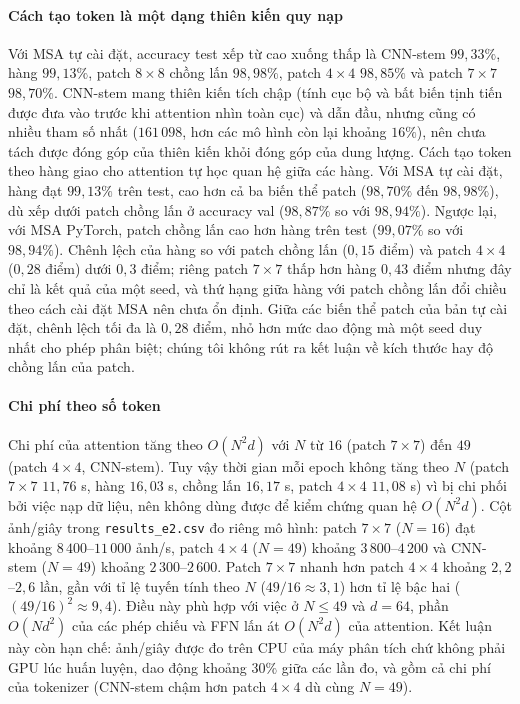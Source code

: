 \documentclass[a4paper,12pt]{article}
\begin{document}
\paragraph{Cách tạo token là một dạng thiên kiến quy nạp} Với MSA tự cài đặt, accuracy test xếp từ cao xuống thấp là CNN-stem $99{,}33\%$, hàng $99{,}13\%$, patch $8\times8$ chồng lấn $98{,}98\%$, patch $4\times4$ $98{,}85\%$ và patch $7\times7$ $98{,}70\%$. CNN-stem mang thiên kiến tích chập (tính cục bộ và bất biến tịnh tiến được đưa vào trước khi attention nhìn toàn cục) và dẫn đầu, nhưng cũng có nhiều tham số nhất ($161\,098$, hơn các mô hình còn lại khoảng $16\%$), nên chưa tách được đóng góp của thiên kiến khỏi đóng góp của dung lượng. Cách tạo token theo hàng giao cho attention tự học quan hệ giữa các hàng. Với MSA tự cài đặt, hàng đạt $99{,}13\%$ trên test, cao hơn cả ba biến thể patch ($98{,}70\%$ đến $98{,}98\%$), dù xếp dưới patch chồng lấn ở accuracy val ($98{,}87\%$ so với $98{,}94\%$). Ngược lại, với MSA PyTorch, patch chồng lấn cao hơn hàng trên test ($99{,}07\%$ so với $98{,}94\%$). Chênh lệch của hàng so với patch chồng lấn ($0{,}15$ điểm) và patch $4\times4$ ($0{,}28$ điểm) dưới $0{,}3$ điểm; riêng patch $7\times7$ thấp hơn hàng $0{,}43$ điểm nhưng đây chỉ là kết quả của một seed, và thứ hạng giữa hàng với patch chồng lấn đổi chiều theo cách cài đặt MSA nên chưa ổn định. Giữa các biến thể patch của bản tự cài đặt, chênh lệch tối đa là $0{,}28$ điểm, nhỏ hơn mức dao động mà một seed duy nhất cho phép phân biệt; chúng tôi không rút ra kết luận về kích thước hay độ chồng lấn của patch.

\paragraph{Chi phí theo số token} Chi phí của attention tăng theo $O(N^2d)$ với $N$ từ $16$ (patch $7\times7$) đến $49$ (patch $4\times4$, CNN-stem). Tuy vậy thời gian mỗi epoch không tăng theo $N$ (patch $7\times7$ $11{,}76$ s, hàng $16{,}03$ s, chồng lấn $16{,}17$ s, patch $4\times4$ $11{,}08$ s) vì bị chi phối bởi việc nạp dữ liệu, nên không dùng được để kiểm chứng quan hệ $O(N^2d)$. Cột ảnh/giây trong \texttt{results\_e2.csv} đo riêng mô hình: patch $7\times7$ ($N=16$) đạt khoảng $8\,400$--$11\,000$ ảnh/s, patch $4\times4$ ($N=49$) khoảng $3\,800$--$4\,200$ và CNN-stem ($N=49$) khoảng $2\,300$--$2\,600$. Patch $7\times7$ nhanh hơn patch $4\times4$ khoảng $2{,}2$--$2{,}6$ lần, gần với tỉ lệ tuyến tính theo $N$ ($49/16\approx3{,}1$) hơn tỉ lệ bậc hai ($(49/16)^2\approx9{,}4$). Điều này phù hợp với việc ở $N\le49$ và $d=64$, phần $O(Nd^2)$ của các phép chiếu và FFN lấn át $O(N^2d)$ của attention. Kết luận này còn hạn chế: ảnh/giây được đo trên CPU của máy phân tích chứ không phải GPU lúc huấn luyện, dao động khoảng $30\%$ giữa các lần đo, và gồm cả chi phí của tokenizer (CNN-stem chậm hơn patch $4\times4$ dù cùng $N=49$).
\end{document}

